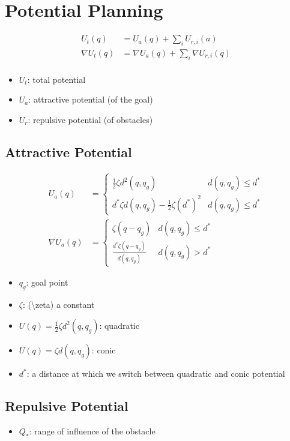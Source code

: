 \chapter{Potential Planning}

  \begin{align}
    U_{t}\left( q \right)
      &= U_{a}\left( q \right) + \sum_{i} U_{r, i}\left( a \right) \\
    \nabla U_{t}\left( q \right)
      &= \nabla U_{a}\left( q \right) + \sum_{i} \nabla U_{r, i}\left( q \right) \\
  \end{align}

  \begin{itemize}
    \item $ U_{t} $: total potential
    \item $ U_{a} $: attractive potential (of the goal)
    \item $ U_{r} $: repulsive potential (of obstacles)
  \end{itemize}

  \section{Attractive Potential}

    \begin{align}
      U_{a}\left( q \right) &=
      \begin{cases}
        \frac{1}{2} \zeta d^{2}\left( q, q_{g} \right)
          & d\left( q, q_{g} \right) \le d^{*} \\
        d^{*} \zeta d\left( q, q_{g} \right) - \frac{1}{2} \zeta \left( d^{*} \right)^{2}
          & d\left( q, q_{g} \right) \le d^{*}
      \end{cases}  \\
      \nabla U_{a}\left( q \right) &=
      \begin{cases}
        \zeta\left( q - q_{g} \right) & d\left( q, q_{g} \right) \le d^{*} \\
        \frac{d^{*} \zeta \left( q - q_{g} \right)}{d\left( q, q_{g} \right)}
          & d\left( q, q_{g} \right) > d^{*}
      \end{cases}
    \end{align}

    \begin{itemize}
      \item $ q_{g} $: goal point
      \item $ \zeta $: ({\ttfamily \textbackslash zeta}) a constant
      \item $ U\left( q \right) = \frac{1}{2} \zeta d^{2}\left( q, q_{g} \right) $:
      quadratic
      \item $ U\left( q \right) = \zeta d\left( q, q_{g} \right) $: conic
      \item $ d^{*} $: a distance at which we switch between quadratic and conic
      potential
    \end{itemize}

  \section{Repulsive Potential}

    \begin{itemize}
      \item $ Q_{*} $: range of influence of the obstacle
    \end{itemize}
